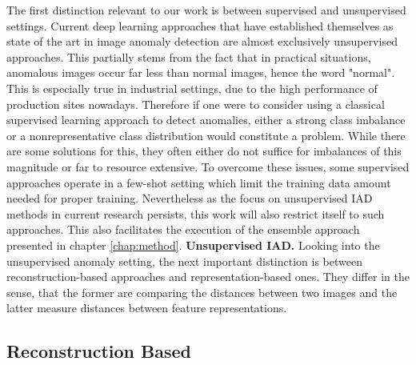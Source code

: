 The first distinction relevant to our work is between supervised and unsupervised settings. Current deep learning approaches that have established themselves as state of the art in image anomaly detection 
are almost exclusively unsupervised approaches. This partially stems from the fact 
that in practical situations, anomalous images occur far less than normal images, hence the word "normal". This is especially true in industrial settings, due to the high performance of 
production sites nowadays. Therefore if one were to consider using a classical supervised learning approach to detect anomalies, either a strong class imbalance or a nonrepresentative class 
distribution would constitute a problem. While there are some solutions for this, they often either do not suffice for imbalances of this magnitude or far to resource extensive. To overcome 
these issues, some supervised approaches \cite{Chu_2020supervised} operate in a few-shot setting which limit the training data amount needed for proper training. Nevertheless as the focus on 
unsupervised IAD methods in current research persists, 
this work will also restrict itself to such approaches. This also facilitates the execution of the ensemble approach presented in chapter \ref{chap:method}.
\newline
\textbf{Unsupervised IAD.} Looking into the unsupervised anomaly setting, the next important distinction is between reconstruction-based approaches and representation-based ones. They differ in the sense, that the former 
are comparing the distances between two images and the latter measure distances between feature representations.

\subsection{Reconstruction Based}

